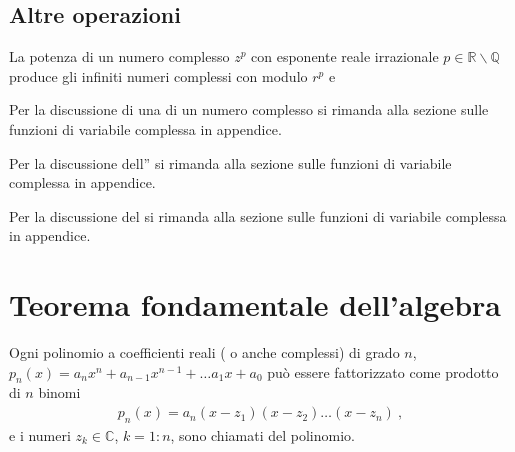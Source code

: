 \documentclass[letterpaper,10pt,italian]{jupyterBook}
\begin{document}
\subsection{Altre operazioni}
\label{\detokenize{ch/algebra/complex-algebra:altre-operazioni}}
\sphinxAtStartPar
{} La potenza di un numero complesso \(z^p\) con esponente reale irrazionale \(p \in \mathbb{R} \backslash \mathbb{Q}\) produce gli infiniti numeri complessi con modulo \(r^p\) e 

\sphinxAtStartPar
{} Per la discussione di una {\hyperref[\detokenize{ch/algebra/complex-algebra-notes:math-hs-algebra-complex-notes-fun-power}]{}} di un numero complesso si rimanda alla sezione sulle funzioni di variabile complessa in appendice.

\sphinxAtStartPar
{} Per la discussione dell”{\hyperref[\detokenize{ch/algebra/complex-algebra-notes:math-hs-algebra-complex-notes-fun-exp}]{}} si rimanda alla sezione sulle funzioni di variabile complessa in appendice.

\sphinxAtStartPar
{} Per la discussione del {\hyperref[\detokenize{ch/algebra/complex-algebra-notes:math-hs-algebra-complex-notes-fun-log}]{}} si rimanda alla sezione sulle funzioni di variabile complessa in appendice.


\section{Teorema fondamentale dell’algebra}
\label{\detokenize{ch/algebra/complex-algebra:teorema-fondamentale-dell-algebra}}\label{\detokenize{ch/algebra/complex-algebra:math-hs-algebra-complex-fund-thm}}
\sphinxAtStartPar
Ogni polinomio a coefficienti reali ( o anche complessi) di grado \(n\), \(p_n(x) = a_n x^n + a_{n-1} x^{n-1} + \dots a_1 x + a_0\) può essere fattorizzato come prodotto di \(n\) binomi
\begin{equation*}
\begin{split}p_n(x) = a_n ( x - z_1 )( x - z_2 )\dots( x - z_n) \ ,\end{split}
\end{equation*}
\sphinxAtStartPar
e i numeri \(z_k \in \mathbb{C}\), \(k = 1:n\), sono chiamati  del polinomio.
\end{document}
